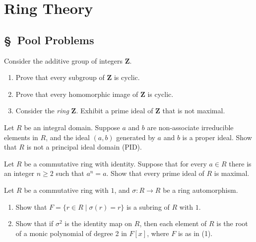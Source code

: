 \documentclass[11pt,twoside,openany]{memoir}
\begin{document}
\chapter*{Ring Theory}
\section*{\S\ Pool Problems}
\begin{exercise}
    Consider the additive group of integers $\mathbf{Z}$.
    \begin{enumerate}[label = (\arabic*)]
        \item Prove that every subgroup of $\mathbf{Z}$ is cyclic.
        \item Prove that every homomorphic image of $\mathbf{Z}$ is cyclic.
        \item Consider the \textit{ring} $\mathbf{Z}$. Exhibit a prime ideal of $\mathbf{Z}$ that is not maximal.
    \end{enumerate}
    \end{exercise}
    
    \begin{exercise}
    Let $R$ be an integral domain. Suppose $a$ and $b$ are non-associate irreducible elements in $R$, and the ideal $(a,b)$ generated by $a$ and $b$ is a proper ideal. Show that $R$ is not a principal ideal domain (PID).
    \end{exercise}
    
    \begin{exercise}
    Let $R$ be a commutative ring with identity. Suppose that for every $a \in R$ there is an integer $n \geq 2$ such that $a^n = a$. Show that every prime ideal of $R$ is maximal.
    \end{exercise}
    
    \begin{exercise}
    Let $R$ be a commutative ring with $1$, and $\sigma:R\to R$ be a ring automorphism.
    \begin{enumerate}[label = (\arabic*)]
        \item Show that $F=\{r\in R\mid \sigma(r)=r\}$ is a subring of $R$ with $1$.
        \item Show that if $\sigma^2$ is the identity map on $R$, then each element of $R$ is the root of a monic polynomial of degree 2 in $F[x]$, where $F$ is as in (1).
    \end{enumerate}
    \end{exercise}
    
\end{document}
